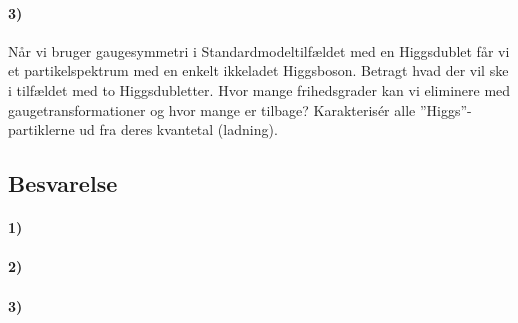 \documentclass[../main.tex]{subfiles}
\begin{document}

\paragraph*{\textbf{3)}}

Når vi bruger gaugesymmetri i Standardmodeltilfældet med en Higgsdublet får vi et partikelspektrum med en enkelt ikkeladet Higgsboson. Betragt hvad der vil ske i tilfældet med to Higgsdubletter. Hvor mange frihedsgrader kan vi eliminere med gaugetransformationer og hvor mange er tilbage? Karakterisér alle ''Higgs''-partiklerne ud fra deres kvantetal (ladning).



\subsection{Besvarelse}


\paragraph[1)]{\textbf{1)}}





\paragraph[2)]{\textbf{2)}}





\paragraph[3)]{\textbf{3)}}




\end{document}
